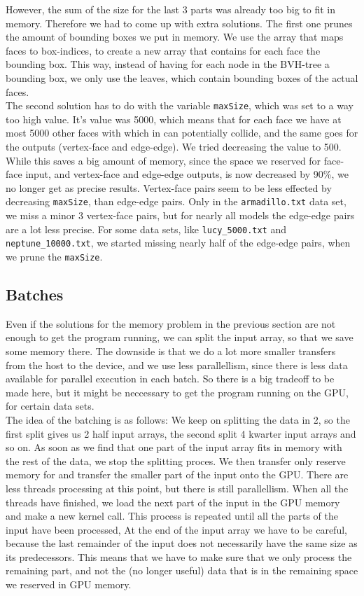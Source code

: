 However, the sum of the size for the last 3 parts was already too big to fit in memory. Therefore we had to come up with extra solutions. The first one prunes the amount of bounding boxes we put in memory. We use the array that maps faces to box-indices, to create a new array that contains for each face the bounding box. This way, instead of having for each node in the BVH-tree a bounding box, we only use the leaves, which contain bounding boxes of the actual faces.\\

The second solution has to do with the variable \texttt{maxSize}, which was set to a way too high value. It's value was 5000, which means that for each face we have at most 5000 other faces with which in can potentially collide, and the same goes for the outputs (vertex-face and edge-edge). We tried decreasing the value to 500. While this saves a big amount of memory, since the space we reserved for face-face input, and vertex-face and edge-edge outputs, is now decreased by 90\%, we no longer get as precise results. Vertex-face pairs seem to be less effected by decreasing \texttt{maxSize}, than edge-edge pairs. Only in the \texttt{armadillo.txt} data set, we miss a minor 3 vertex-face pairs, but for nearly all models the edge-edge pairs are a lot less precise. For some data sets, like \texttt{lucy\_5000.txt} and \texttt{neptune\_10000.txt}, we started missing nearly half of the edge-edge pairs, when we prune the \texttt{maxSize}.

\subsection{Batches}
Even if the solutions for the memory problem in the previous section are not enough to get the program running, we can split the input array, so that we save some memory there. The downside is that we do a lot more smaller transfers from the host to the device, and we use less parallellism, since there is less data available for parallel execution in each batch. So there is a big tradeoff to be made here, but it might be neccessary to get the program running on the GPU, for certain data sets.\\

The idea of the batching is as follows: We keep on splitting the data in 2, so the first split gives us 2 half input arrays, the second split 4 kwarter input arrays and so on. As soon as we find that one part of the input array fits in memory with the rest of the data, we stop the splitting proces. We then transfer only reserve memory for and transfer the smaller part of the input onto the GPU. There are less threads processing at this point, but there is still parallellism. When all the threads have finished, we load the next part of the input in the GPU memory and make a new kernel call. This process is repeated until all the parts of the input have been processed, At the end of the input array we have to be careful, because the last remainder of the input does not necessarily have the same size as its predecessors. This means that we have to make sure that we only process the remaining part, and not the (no longer useful) data that is in the remaining space we reserved in GPU memory.

